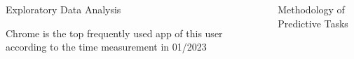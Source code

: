 \documentclass[final]{beamer}
\newlength{\sepwidth}
\newlength{\colwidth}
\newcommand{\separatorcolumn}{\begin{column}{\sepwidth}\end{column}}
\begin{document}
\begin{frame}[t]
\begin{columns}[t]
\begin{column}{\colwidth}
      \begin{block}{\LARGE{Exploratory Data Analysis}}

        \large {Chrome is the top frequently used app of this user according to the time measurement in 01/2023}

        \begin{figure}
          \begin{mdframed}[backgroundcolor=gray!5,linecolor=gray!10]
          \end{mdframed}
        \end{figure}

      \end{block}

    \end{column}

    \separatorcolumn

    \begin{column}{\colwidth}

      \begin{exampleblock}{\LARGE{Methodology of Predictive Tasks}}

        \large{

}
\end{exampleblock}
\end{column}
\end{columns}
\end{frame}
\end{document}
